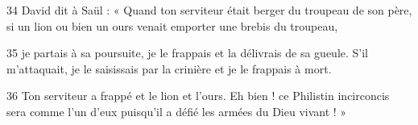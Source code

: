 
34 David dit à Saül : « Quand ton serviteur était berger du troupeau de son père, si un lion ou bien un ours venait emporter une brebis du troupeau,

35 je partais à sa poursuite, je le frappais et la délivrais de sa gueule. S’il m’attaquait, je le saisissais par la crinière et je le frappais à mort.

36 Ton serviteur a frappé et le lion et l’ours. Eh bien ! ce Philistin incirconcis sera comme l’un d’eux puisqu’il a défié les armées du Dieu vivant ! »